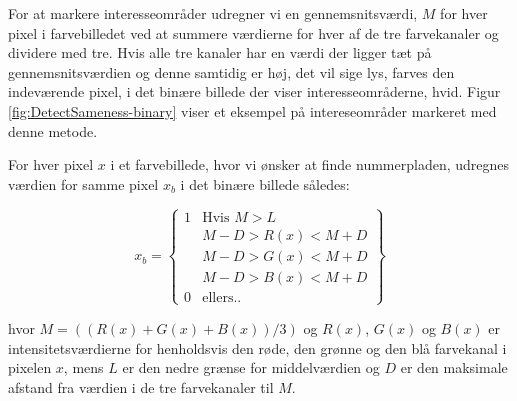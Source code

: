 For at markere interesseområder udregner vi en gennemsnitsværdi, $M$ for hver pixel i farvebilledet ved at summere værdierne for hver af de tre farvekanaler og dividere med tre. Hvis alle tre kanaler har en værdi der ligger tæt på gennemsnitsværdien og denne samtidig er høj, det vil sige lys, farves den indeværende pixel, i det binære billede der viser interesseområderne, hvid. Figur \ref{fig:DetectSameness-binary} viser et eksempel på intereseområder markeret med denne metode. 

For hver pixel $x$ i et farvebillede, hvor vi ønsker at finde nummerpladen, udregnes værdien for samme pixel $x_{b}$ i det binære billede således:

\begin{equation}
x_{b} = 
\begin{Bmatrix}
1 & \text{Hvis } M > L\\
 & M-D > R(x) < M+D\\
  & M-D > G(x) < M+D\\
   & M-D > B(x) < M+D\\
0 & \text{ellers..}
\end{Bmatrix}
\end{equation}


hvor $M = ((R(x)+G(x)+B(x))/3)$ og $R(x)$, $G(x)$ og $B(x)$ er intensitetsværdierne for henholdsvis den røde, den grønne og den blå farvekanal i pixelen $x$, mens $L$ er den nedre grænse for middelværdien og $D$ er den maksimale afstand fra værdien i de tre farvekanaler til $M$.




